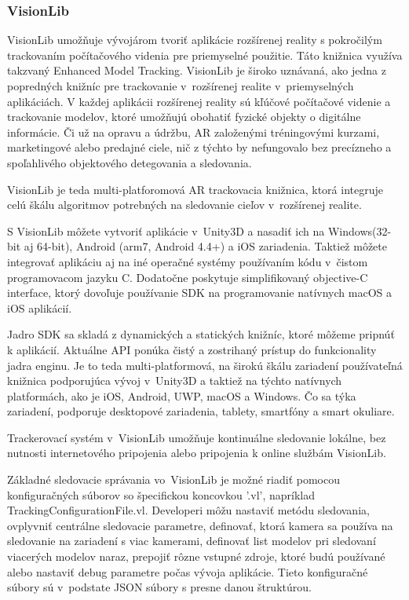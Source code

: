 \subsubsection{VisionLib}

VisionLib umožňuje vývojárom tvoriť aplikácie rozšírenej reality s pokročilým trackovaním počítačového videnia pre priemyselné použitie. Táto knižnica využíva takzvaný Enhanced Model Tracking. VisionLib je široko uznávaná, ako jedna z popredných knižníc pre trackovanie v~rozšírenej realite v~priemyselných aplikáciách. V každej aplikácii rozšírenej reality sú kľúčové počítačové videnie a trackovanie modelov, ktoré umožňujú obohatiť fyzické objekty o digitálne informácie. Či už na opravu a údržbu, AR založenými tréningovými kurzami, marketingové alebo predajné ciele, nič z týchto by nefungovalo bez precízneho a spoľahlivého objektového detegovania a sledovania.

VisionLib je teda multi-platforomová AR trackovacia knižnica, ktorá integruje celú škálu algoritmov potrebných na sledovanie cieľov v~rozšírenej realite.  

S VisionLib môžete vytvoriť aplikácie v~Unity3D a nasadiť ich na Windows(32-bit aj 64-bit), Android (arm7, Android 4.4+) a iOS zariadenia. Taktiež môžete integrovať aplikáciu aj na iné operačné systémy používaním kódu v~čistom programovacom jazyku C. Dodatočne poskytuje simplifikovaný objective-C interface, ktorý dovoľuje používanie SDK na programovanie natívnych macOS a iOS aplikácií. 

Jadro SDK sa skladá z dynamických a statických knižníc, ktoré môžeme pripnúť k aplikácií. Aktuálne API ponúka čistý a zostrihaný prístup do funkcionality jadra enginu. Je to teda multi-platformová, na širokú škálu zariadení používateľná knižnica podporujúca vývoj v~Unity3D a taktiež na týchto natívnych platformách, ako je iOS, Android, UWP, macOS a Windows. Čo sa týka zariadení, podporuje desktopové zariadenia, tablety, smartfóny a smart okuliare. 

Trackerovací systém v~VisionLib umožňuje kontinuálne sledovanie lokálne, bez nutnosti internetového pripojenia alebo pripojenia k online službám VisionLib.

Základné sledovacie správania vo~VisionLib je možné riadiť pomocou konfiguračných súborov so špecifickou koncovkou '.vl', napríklad TrackingConfigurationFile.vl. Developeri môžu nastaviť metódu sledovania, ovplyvniť centrálne sledovacie parametre, definovať, ktorá kamera sa používa na sledovanie na zariadení s viac kamerami, definovať list modelov pri sledovaní viacerých modelov naraz, prepojiť rôzne vstupné zdroje, ktoré budú používané alebo nastaviť debug parametre počas vývoja aplikácie. Tieto konfiguračné súbory sú v~podstate JSON súbory s presne danou štruktúrou.

